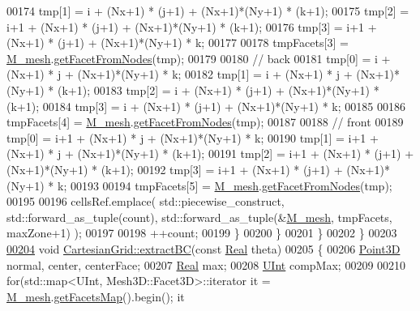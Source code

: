 \begin{DoxyCode}
00174                 tmp[1] = i + (Nx+1) * (j+1) + (Nx+1)*(Ny+1) * (k+1);
00175                 tmp[2] = i+1 + (Nx+1) * (j+1) + (Nx+1)*(Ny+1) * (k+1);
00176                 tmp[3] = i+1 + (Nx+1) * (j+1) + (Nx+1)*(Ny+1) * k;
00177 
00178                 tmpFacets[3] = \hyperlink{classFVCode3D_1_1CartesianGrid_a40c64e663b3d2de02b852403c75495fb}{M\_mesh}.\hyperlink{classFVCode3D_1_1Mesh3D_a2ac0b84c13a15ed42cdd8c98066eae98}{getFacetFromNodes}(tmp);
00179 
00180                 \textcolor{comment}{// back}
00181                 tmp[0] = i + (Nx+1) * j + (Nx+1)*(Ny+1) * k;
00182                 tmp[1] = i + (Nx+1) * j + (Nx+1)*(Ny+1) * (k+1);
00183                 tmp[2] = i + (Nx+1) * (j+1) + (Nx+1)*(Ny+1) * (k+1);
00184                 tmp[3] = i + (Nx+1) * (j+1) + (Nx+1)*(Ny+1) * k;
00185 
00186                 tmpFacets[4] = \hyperlink{classFVCode3D_1_1CartesianGrid_a40c64e663b3d2de02b852403c75495fb}{M\_mesh}.\hyperlink{classFVCode3D_1_1Mesh3D_a2ac0b84c13a15ed42cdd8c98066eae98}{getFacetFromNodes}(tmp);
00187 
00188                 \textcolor{comment}{// front}
00189                 tmp[0] = i+1 + (Nx+1) * j + (Nx+1)*(Ny+1) * k;
00190                 tmp[1] = i+1 + (Nx+1) * j + (Nx+1)*(Ny+1) * (k+1);
00191                 tmp[2] = i+1 + (Nx+1) * (j+1) + (Nx+1)*(Ny+1) * (k+1);
00192                 tmp[3] = i+1 + (Nx+1) * (j+1) + (Nx+1)*(Ny+1) * k;
00193 
00194                 tmpFacets[5] = \hyperlink{classFVCode3D_1_1CartesianGrid_a40c64e663b3d2de02b852403c75495fb}{M\_mesh}.\hyperlink{classFVCode3D_1_1Mesh3D_a2ac0b84c13a15ed42cdd8c98066eae98}{getFacetFromNodes}(tmp);
00195 
00196                 cellsRef.emplace( std::piecewise\_construct, std::forward\_as\_tuple(count), 
      std::forward\_as\_tuple(&\hyperlink{classFVCode3D_1_1CartesianGrid_a40c64e663b3d2de02b852403c75495fb}{M\_mesh}, tmpFacets, maxZone+1) );
00197 
00198                 ++count;
00199             \}
00200         \}
00201     \}
00202 \}
00203 
\hypertarget{CartesianGrid_8cpp_source.tex_l00204}{}\hyperlink{classFVCode3D_1_1CartesianGrid_a8e96033c8f0f0f7b326bba2a87a20c41}{00204} \textcolor{keywordtype}{void} \hyperlink{classFVCode3D_1_1CartesianGrid_a8e96033c8f0f0f7b326bba2a87a20c41}{CartesianGrid::extractBC}(\textcolor{keyword}{const} \hyperlink{namespaceFVCode3D_a40c1f5588a248569d80aa5f867080e83}{Real} theta)
00205 \{
00206     \hyperlink{classFVCode3D_1_1Point3D}{Point3D} normal, center, centerFace;
00207     \hyperlink{namespaceFVCode3D_a40c1f5588a248569d80aa5f867080e83}{Real} max;
00208     \hyperlink{namespaceFVCode3D_a4bf7e328c75d0fd504050d040ebe9eda}{UInt} compMax;
00209 
00210     \textcolor{keywordflow}{for}(std::map<UInt, Mesh3D::Facet3D>::iterator it = \hyperlink{classFVCode3D_1_1CartesianGrid_a40c64e663b3d2de02b852403c75495fb}{M\_mesh}.\hyperlink{classFVCode3D_1_1Mesh3D_a76de387da2a552e3e1210d795bc7acf9}{getFacetsMap}().begin(); it 

\end{DoxyCode}
